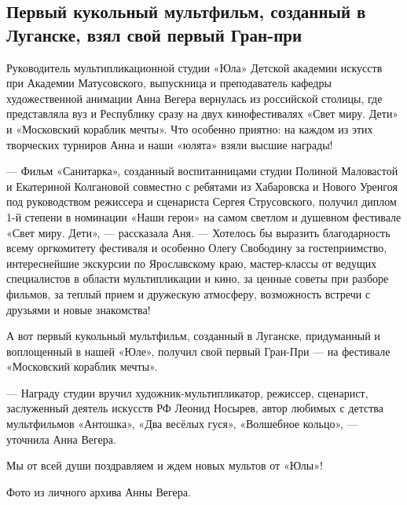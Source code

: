  
 
 
 
 
\subsection{Первый кукольный мультфильм, созданный в Луганске, взял свой первый Гран-при}
\label{sec:02_06_2021.stz.edu.lnr.lgaki.1.kukolnyj_multfilm_granpri}

Руководитель мультипликационной студии «Юла» Детской академии искусств при
Академии Матусовского, выпускница и преподаватель кафедры художественной
анимации Анна Вегера вернулась из российской столицы, где представляла вуз и
Республику сразу на двух кинофестивалях «Свет миру. Дети» и «Московский
кораблик мечты». Что особенно приятно: на каждом из этих творческих турниров
Анна и наши «юлята» взяли высшие награды!


— Фильм «Санитарка», созданный воспитанницами студии Полиной Маловастой и
Екатериной Колгановой совместно с ребятами из Хабаровска и Нового Уренгоя под
руководством режиссера и сценариста Сергея Струсовского, получил диплом 1-й
степени в номинации «Наши герои» на самом светлом и душевном фестивале «Свет
миру. Дети», — рассказала Аня. — Хотелось бы выразить благодарность всему
оргкомитету фестиваля и особенно Олегу Свободину за гостеприимство,
интереснейшие экскурсии по Ярославскому краю, мастер-классы от ведущих
специалистов в области мультипликации и кино, за ценные советы при разборе
фильмов, за теплый прием и дружескую атмосферу, возможность встречи с друзьями
и новые знакомства!


А вот первый кукольный мультфильм, созданный в Луганске, придуманный и
воплощенный в нашей «Юле», получил свой первый Гран-При — на фестивале
«Московский кораблик мечты».

— Награду студии вручил художник-мультипликатор, режиссер, сценарист,
заслуженный деятель искусств РФ Леонид Носырев, автор любимых с детства
мультфильмов «Антошка», «Два весёлых гуся», «Волшебное кольцо», — уточнила Анна
Вегера.

Мы от всей души поздравляем и ждем новых мультов от «Юлы»!

Фото из личного архива Анны Вегера.

